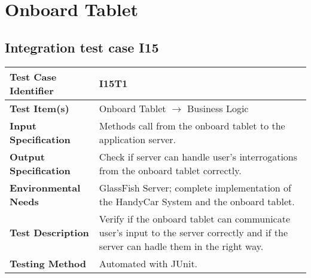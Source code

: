 \section{Onboard Tablet}
\subsection{Integration test case I15}

\begin{tabular}{l p{}}
    \hline
    \textbf{Test Case Identifier} & I15T1\\
    \hline
    \textbf{Test Item(s)} & Onboard Tablet $\rightarrow$ Business Logic\\
    \hline
    \textbf{Input Specification} & Methods call from the onboard tablet to the application server.\\
    \hline
    \textbf{Output Specification} & Check if server can handle user’s interrogations from the onboard tablet correctly.\\
    \hline
    \textbf{Environmental Needs} & GlassFish Server; complete implementation of the HandyCar System and the onboard tablet.\\
    \hline
    \textbf{Test Description} & Verify if the onboard tablet can communicate user’s input to the server correctly and if the server can hadle them in the right way.\\
    \hline
    \textbf{Testing Method} & Automated with JUnit.\\
    \hline
\end{tabular}